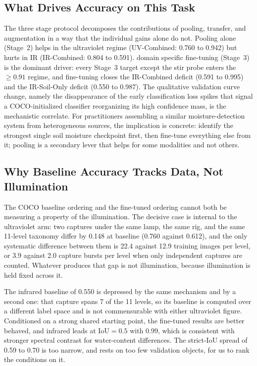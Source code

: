 ﻿\documentclass[journal]{IEEEtran}
\begin{document}
\subsection{What Drives Accuracy on This Task}
The three stage protocol decomposes the contributions of pooling, transfer, and augmentation in a way that the individual gains alone do not. Pooling alone (Stage~2) helps in the ultraviolet regime (UV-Combined: 0.760 to 0.942) but hurts in IR (IR-Combined: 0.804 to 0.591). domain specific fine-tuning (Stage~3) is the dominant driver: every Stage~3 target except the stir probe enters the $\geq 0.91$ regime, and fine-tuning closes the IR-Combined deficit (0.591 to 0.995) and the IR-Soil-Only deficit (0.550 to 0.987). The qualitative validation curve change, namely the disappearance of the early classification loss spikes that signal a COCO-initialized classifier reorganizing its high confidence mass, is the mechanistic correlate. For practitioners assembling a similar moisture-detection system from heterogeneous sources, the implication is concrete: identify the strongest single soil moisture checkpoint first, then fine-tune everything else from it; pooling is a secondary lever that helps for some modalities and not others.

\subsection{Why Baseline Accuracy Tracks Data, Not Illumination}
The COCO baseline ordering and the fine-tuned ordering cannot both be measuring a property of the illumination. The decisive case is internal to the ultraviolet arm: two captures under the same lamp, the same rig, and the same 11-level taxonomy differ by 0.148 at baseline (0.760 against 0.612), and the only systematic difference between them is 22.4 against 12.9 training images per level, or 3.9 against 2.0 capture bursts per level when only independent captures are counted. Whatever produces that gap is not illumination, because illumination is held fixed across it.

The infrared baseline of 0.550 is depressed by the same mechanism and by a second one: that capture spans 7 of the 11 levels, so its baseline is computed over a different label space and is not commensurable with either ultraviolet figure. Conditioned on a strong shared starting point, the fine-tuned results are better behaved, and infrared leads at $\text{IoU}=0.5$ with 0.99, which is consistent with stronger spectral contrast for water-content differences. The strict-IoU spread of 0.59 to 0.70 is too narrow, and rests on too few validation objects, for us to rank the conditions on it.
\end{document}
